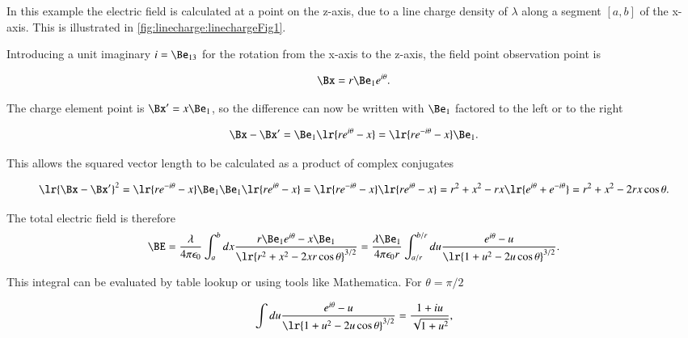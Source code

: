 %
%
In this example the electric field is calculated at a point on the z-axis, due to a line charge density of \( \lambda \) along a segment \( [a,b] \) of the x-axis.  This is illustrated in \cref{fig:linecharge:linechargeFig1}.

Introducing a unit imaginary \( i = \Be_{13} \) for the rotation from the x-axis to the z-axis, the field point observation point is

\begin{dmath}\label{eqn:linecharge:120}
\Bx = r \Be_1 e^{i \theta}.
\end{dmath}

The charge element point is \( \Bx' = x \Be_1 \), so the difference can now be written with \( \Be_1 \) factored to the left or to the right

\begin{equation}\label{eqn:linecharge:20}
\Bx - \Bx'
= \Be_1\lr{ r e^{i\theta} - x }
= \lr{ r e^{-i\theta} - x } \Be_1.
\end{equation}

This allows the squared vector length to be calculated as a product of complex conjugates

\begin{dmath}\label{eqn:linecharge:40}
\lr{ \Bx - \Bx' }^2
= \lr{ r e^{-i\theta} - x } \Be_1 \Be_1\lr{ r e^{i\theta} - x }
= \lr{ r e^{-i\theta} - x } \lr{ r e^{i\theta} - x }
= r^2 + x^2 - r x \lr{ e^{i\theta} + e^{-i\theta} }
= r^2 + x^2 - 2 r x \cos\theta.
\end{dmath}

The total electric field is therefore
\begin{dmath}\label{eqn:linecharge:60}
\BE
= \frac{\lambda}{4 \pi \epsilon_0} \int_a^b dx \frac{ r \Be_1 e^{i\theta} - x \Be_1 }{ \lr{ r^2 + x^2 - 2 x r \cos\theta }^{3/2} }
= \frac{\lambda \Be_1}{4 \pi \epsilon_0 r} \int_{a/r}^{b/r} du \frac{ e^{i\theta} - u }{ \lr{ 1 + u^2 - 2 u \cos\theta }^{3/2} }.
\end{dmath}

This integral can be evaluated by table lookup or using tools like Mathematica.  For \( \theta = \pi/2 \)

\begin{dmath}\label{eqn:linecharge:80}
\int
du \frac{ e^{i\theta} - u }{ \lr{ 1 + u^2 - 2 u \cos\theta }^{3/2} }
= \frac{1 + i u}{\sqrt{1 + u^2}},
\end{dmath}

